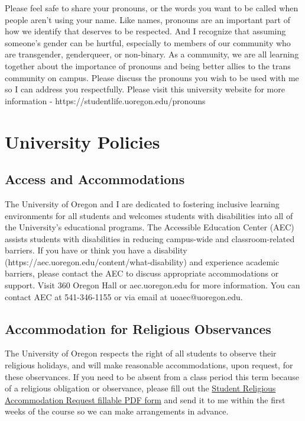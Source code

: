 \documentclass[
  letterpaper,
  DIV=11,
  numbers=noendperiod]{scrartcl}
\begin{document}
Please feel safe to share your pronouns, or the words you want to be
called when people aren't using your name. Like names, pronouns are an
important part of how we identify that deserves to be respected. And I
recognize that assuming someone's gender can be hurtful, especially to
members of our community who are transgender, genderqueer, or
non-binary. As a community, we are all learning together about the
importance of pronouns and being better allies to the trans community on
campus. Please discuss the pronouns you wish to be used with me so I can
address you respectfully. Please visit this university website for more
information - https://studentlife.uoregon.edu/pronouns

\hypertarget{university-policies}{%
\section{University Policies}\label{university-policies}}

\hypertarget{access-and-accommodations}{%
\subsection{Access and Accommodations}\label{access-and-accommodations}}

The University of Oregon and I are dedicated to fostering inclusive
learning environments for all students and welcomes students with
disabilities into all of the University's educational programs. The
Accessible Education Center (AEC) assists students with disabilities in
reducing campus-wide and classroom-related barriers. If you have or
think you have a disability
(https://aec.uoregon.edu/content/what-disability) and experience
academic barriers, please contact the AEC to discuss appropriate
accommodations or support. Visit 360 Oregon Hall or aec.uoregon.edu for
more information. You can contact AEC at 541-346-1155 or via email at
uoaec@uoregon.edu.

\hypertarget{accommodation-for-religious-observances}{%
\subsection{Accommodation for Religious
Observances}\label{accommodation-for-religious-observances}}

The University of Oregon respects the right of all students to observe
their religious holidays, and will make reasonable accommodations, upon
request, for these observances. If you need to be absent from a class
period this term because of a religious obligation or observance, please
fill out the
\href{https://registrar.uoregon.edu/sites/all/files/pdf/form-religious-accommodation-request.pdf}{Student
Religious Accommodation Request fillable PDF form} and send it to me
within the first weeks of the course so we can make arrangements in
advance.
\end{document}
